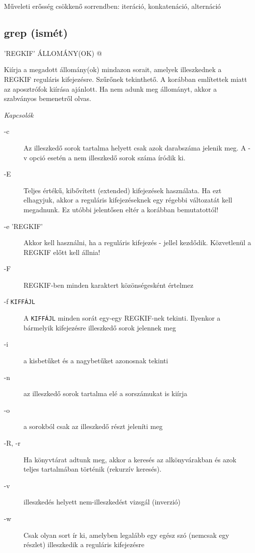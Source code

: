 Műveleti erősség csökkenő sorrendben: iteráció, konkatenáció, alternáció




\subsection{grep (ismét)}
\begin{center}
\verb@grep ’REGKIF’ ÁLLOMÁNY(OK) @
\end{center}

Kiírja a megadott állomány(ok) mindazon sorait, amelyek illeszkednek a REGKIF reguláris kifejezésre. Szűrőnek tekinthető.
%
A korábban említettek miatt az aposztrófok kiírása ajánlott.
%
Ha nem adunk meg állományt, akkor a szabványos bemenetről olvas.
\bigskip

\textit{Kapcsolók}
\begin{description}
 \item[-c] Az illeszkedő sorok tartalma helyett csak azok darabszáma jelenik meg. A -v opció esetén a nem illeszkedő sorok száma íródik ki.
\item[-E] Teljes értékű, kibővített (extended) kifejezések használata. Ha ezt elhagyjuk, akkor a reguláris kifejezéseknek egy régebbi változatát kell megadnunk. Ez utóbbi jelentősen eltér a korábban bemutatottól!
\item[-e ’REGKIF’] Akkor kell használni, ha a reguláris kifejezés - jellel kezdődik. Közvetlenül a REGKIF előtt kell állnia!
\item[-F] REGKIF-ben minden karaktert közönségesként értelmez
\item[-f \texttt{KIFFÁJL}] A \texttt{KIFFÁJL} minden sorát egy-egy REGKIF-nek tekinti. Ilyenkor a bármelyik kifejezésre illeszkedő sorok jelennek meg
\item[-i] a kisbetűket és a nagybetűket azonosnak tekinti
\item[-n] az illeszkedő sorok tartalma elé a sorszámukat is kiírja
\item[-o] a sorokból csak az illeszkedő részt jeleníti meg
\item[-R, -r] Ha könyvtárat adtunk meg, akkor a keresés az alkönyvárakban és azok teljes tartalmában történik (rekurzív keresés).
\item[-v] illeszkedés helyett nem-illeszkedést vizsgál (inverzió)
\item[-w] Csak olyan sort ír ki, amelyben legalább egy egész szó (nemcsak egy részlet) illeszkedik a reguláris kifejezésre
\end{description}

